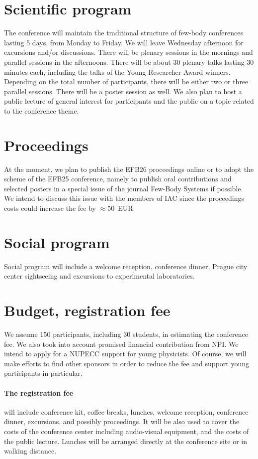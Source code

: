 \documentclass[12pt]{extarticle}
\begin{document}
\section*{Scientific program}
\noindent
The conference will maintain the traditional structure of few-body
conferences lasting 5 days, from Monday to Friday. We will leave
Wednesday afternoon for excursions and/or discussions. There will be
plenary sessions in the mornings and parallel sessions in the
afternoons. There will be about 30 plenary talks lasting 30 minutes
each, including the talks of the Young Researcher Award winners.
Depending on the total number of participants, there will be either
two or three parallel sessions. There will be a poster session as
well. We also plan to host a public lecture of general interest for
participants and the public on a topic related to the conference
theme.

\section*{Proceedings}
\noindent
At the moment, we plan to publish the EFB26 proceedings online or to
adopt the scheme of the EFB25 conference, namely to publish oral
contributions and selected posters in a special issue of the journal
Few-Body Systems if possible. We intend to discuss this issue with the
members of IAC since the proceedings costs could increase the fee by
\(\approx 50\)~EUR.

\section*{Social program}
\noindent
Social program will include a welcome reception, conference dinner,
Prague city center sightseeing and excursions to experimental
laboratories.

\section*{Budget, registration fee}
\noindent
We assume 150 participants, including 30 students, in estimating the
conference fee. We also took into account promised financial
contribution from NPI. We intend to apply for a NUPECC support for
young physicists. Of course, we will make efforts to find other
sponsors in order to reduce the fee and support young participants in
particular.

\paragraph{The registration fee} will include conference kit, coffee
breaks, lunches, welcome reception, conference dinner, excursions, and
possibly proceedings. It will be also used to cover the costs of the
conference center including audio-visual equipment, and the costs of
the public lecture. Lunches will be arranged directly at the
conference site or in walking distance.
\end{document}
